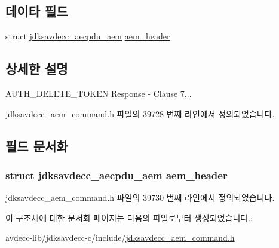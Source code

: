 \subsection*{데이타 필드}
\begin{DoxyCompactItemize}
\item 
struct \hyperlink{structjdksavdecc__aecpdu__aem}{jdksavdecc\+\_\+aecpdu\+\_\+aem} \hyperlink{structjdksavdecc__aem__command__auth__delete__token__response_ae1e77ccb75ff5021ad923221eab38294}{aem\+\_\+header}
\end{DoxyCompactItemize}


\subsection{상세한 설명}
A\+U\+T\+H\+\_\+\+D\+E\+L\+E\+T\+E\+\_\+\+T\+O\+K\+EN Response -\/ Clause 7... 

jdksavdecc\+\_\+aem\+\_\+command.\+h 파일의 39728 번째 라인에서 정의되었습니다.



\subsection{필드 문서화}
\subsubsection[{\texorpdfstring{aem\+\_\+header}{aem_header}}]{\setlength{\rightskip}{0pt plus 5cm}struct {\bf jdksavdecc\+\_\+aecpdu\+\_\+aem} aem\+\_\+header}\hypertarget{structjdksavdecc__aem__command__auth__delete__token__response_ae1e77ccb75ff5021ad923221eab38294}{}\label{structjdksavdecc__aem__command__auth__delete__token__response_ae1e77ccb75ff5021ad923221eab38294}


jdksavdecc\+\_\+aem\+\_\+command.\+h 파일의 39730 번째 라인에서 정의되었습니다.



이 구조체에 대한 문서화 페이지는 다음의 파일로부터 생성되었습니다.\+:\begin{DoxyCompactItemize}
\item 
avdecc-\/lib/jdksavdecc-\/c/include/\hyperlink{jdksavdecc__aem__command_8h}{jdksavdecc\+\_\+aem\+\_\+command.\+h}\end{DoxyCompactItemize}
